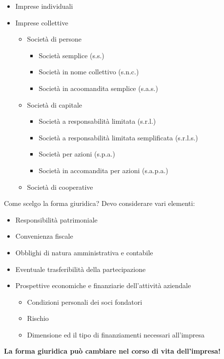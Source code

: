 \documentclass[../main.tex]{subfiles}
\begin{document}
\begin{itemize}
	\item Imprese individuali

	\item Imprese collettive
	      \begin{itemize}
		      \item Società di persone
		            \begin{itemize}
			            \item Società semplice (s.s.)
			            \item Società in nome collettivo (s.n.c.)
			            \item Società in acoomandita semplice (s.a.s.)
		            \end{itemize}

		      \item Società di capitale
		            \begin{itemize}
			            \item Società a responsabilità limitata (s.r.l.)
			            \item Società a responsabilità limitata semplificata (s.r.l.s.)
			            \item Società per azioni (s.p.a.)
			            \item Società in accomandita per azioni (s.a.p.a.)
		            \end{itemize}

		      \item Società di cooperative

	      \end{itemize}
\end{itemize}

Come scelgo la forma giuridica? Devo considerare vari elementi:

\begin{itemize}
	\item Responsibilità patrimoniale
	\item Convenienza fiscale
	\item Obblighi di natura amministrativa e contabile
	\item Eventuale trasferibilità della partecipazione
	\item Prospettive economiche e finanziarie dell'attività aziendale
	      \begin{itemize}
		      \item Condizioni personali dei soci fondatori
		      \item Rischio
		      \item Dimensione ed il tipo di finanziamenti necessari all'impresa
	      \end{itemize}
\end{itemize}

\textbf{La forma giuridica può cambiare nel corso di vita dell'impresa!}
\end{document}
